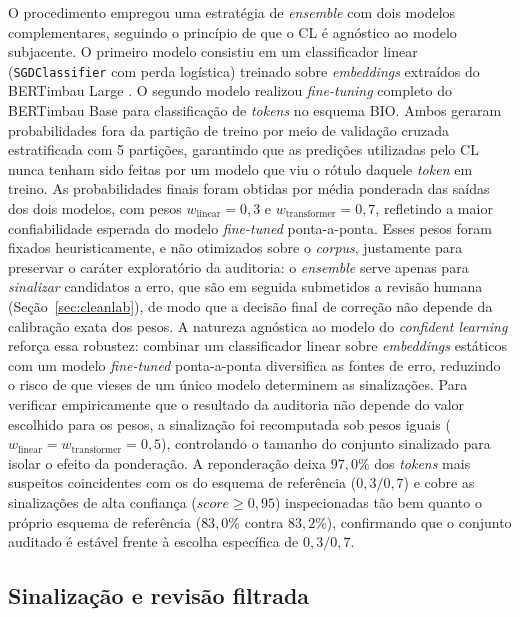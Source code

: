 O procedimento empregou uma estratégia de \textit{ensemble} com dois modelos complementares, seguindo o princípio de que o CL é agnóstico ao modelo subjacente. O primeiro modelo consistiu em um classificador linear (\texttt{SGDClassifier} com perda logística) treinado sobre \textit{embeddings} extraídos do BERTimbau Large \cite{Souza2020}. O segundo modelo realizou \textit{fine-tuning} completo do BERTimbau Base para classificação de \textit{tokens} no esquema BIO. Ambos geraram probabilidades fora da partição de treino por meio de validação cruzada estratificada com 5 partições, garantindo que as predições utilizadas pelo CL nunca tenham sido feitas por um modelo que viu o rótulo daquele \textit{token} em treino. As probabilidades finais foram obtidas por média ponderada das saídas dos dois modelos, com pesos $w_{\text{linear}} = 0{,}3$ e $w_{\text{transformer}} = 0{,}7$, refletindo a maior confiabilidade esperada do modelo \textit{fine-tuned} ponta-a-ponta. Esses pesos foram fixados heuristicamente, e não otimizados sobre o \textit{corpus}, justamente para preservar o caráter exploratório da auditoria: o \textit{ensemble} serve apenas para \emph{sinalizar} candidatos a erro, que são em seguida submetidos a revisão humana (Seção~\ref{sec:cleanlab}), de modo que a decisão final de correção não depende da calibração exata dos pesos. A natureza agnóstica ao modelo do \textit{confident learning} reforça essa robustez: combinar um classificador linear sobre \textit{embeddings} estáticos com um modelo \textit{fine-tuned} ponta-a-ponta diversifica as fontes de erro, reduzindo o risco de que vieses de um único modelo determinem as sinalizações. Para verificar empiricamente que o resultado da auditoria não depende do valor escolhido para os pesos, a sinalização foi recomputada sob pesos iguais ($w_{\text{linear}} = w_{\text{transformer}} = 0{,}5$), controlando o tamanho do conjunto sinalizado para isolar o efeito da ponderação. A reponderação deixa $97{,}0\%$ dos \textit{tokens} mais suspeitos coincidentes com os do esquema de referência ($0{,}3/0{,}7$) e cobre as sinalizações de alta confiança ($\textit{score} \geq 0{,}95$) inspecionadas tão bem quanto o próprio esquema de referência ($83{,}0\%$ contra $83{,}2\%$), confirmando que o conjunto auditado é estável frente à escolha específica de $0{,}3/0{,}7$.

\subsection{Sinalização e revisão filtrada}

